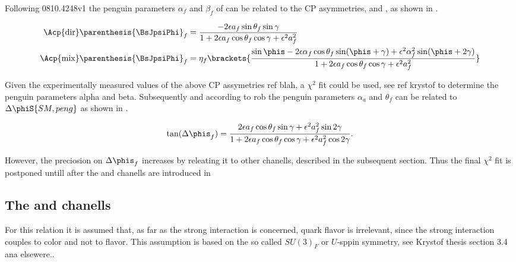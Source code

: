 Following {\color{red} 0810.4248v1} the penguin parameters $\alpha_f$ and $\beta_f$ of 
can be related to the CP asymmetries,  and ,
as shown in \equref{}.

\begin{align}
  \Acp{\rm dir}\parenthesis{\BsJpsiPhi}_f &= \frac{ -2\epsilon a_f \sin\theta_f \sin\gamma} {1 + 2\epsilon a_f \cos\theta_f \cos\gamma + \epsilon^2 a_f^{2}} \\
  \Acp{\rm mix}\parenthesis{\BsJpsiPhi}_f &= \eta_f \brackets{\frac{\sin\phis - 2\epsilon\alpha_f \cos\theta_f\sin(\phis+\gamma) + \epsilon^2\alpha_f^2 \sin(\phis+2\gamma)}
                                                                 {1 + 2\epsilon a_f \cos\theta_f \cos\gamma + \epsilon^2a_f^{2}} }
  \label{bsjpsiphi_peng_acp_obs}
\end{align}

Given the experimentally measured values of the above CP assymetries {\color{red} ref blah}, a $\chi^2$ fit could be used,
see ref {\color{red} krystof} to determine the penguin parameters alpha and beta. Subsequently and according to rob
the penguin parameters $\alpha_a$ and $\theta_f$ can be related to $\Delta\phiS{SM,peng}$ as shown in .

\begin{equation}
\tan(\Delta{\phis}_f) = \frac{2\epsilon a_f \cos\theta_f \sin\gamma+\epsilon^2 a^2_f \sin2\gamma}{1+2\epsilon a_f \cos\theta_f \cos\gamma+ \epsilon^2 a^2_f \cos2\gamma}.
\label{tandelta}
\end{equation}

However, the preciosion on $\Delta{\phis}_f$ increases by releating it to other chanells, described in the subsequent section.
Thus the final $\chi^2$ fit is postponed untill after the \BsJpsiKst and \BsJpsiRho chanells are introduced in 

\subsection{The \BsJpsiKst and \BsJpsiRho chanells}
\label{penguin_more_chanells}

For this relation it is assumed that, as far as the strong interaction is concerned, quark flavor is irrelevant,
since the strong interaction couples to color and not to flavor. This assumption is based on the so called $SU(3)_F$ or $U$-sppin symmetry,
see {\color{red} Krystof thesis section 3.4 ana elsewere.}.

